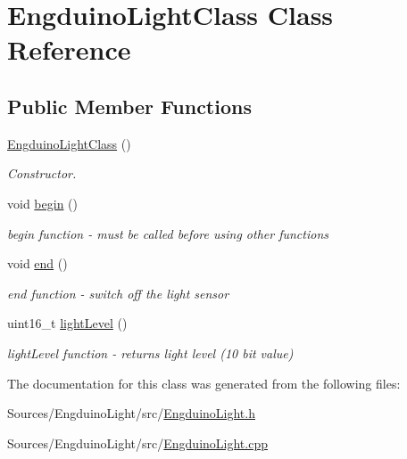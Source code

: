 \hypertarget{class_engduino_light_class}{}\section{Engduino\+Light\+Class Class Reference}
\label{class_engduino_light_class}
\subsection*{Public Member Functions}
\begin{DoxyCompactItemize}
\item 
\hyperlink{group___engduino_light_ga865276a25a2d2934c9a12f91e61d2e39}{Engduino\+Light\+Class} ()
\begin{DoxyCompactList}\small\item\em Constructor. \end{DoxyCompactList}\item 
void \hyperlink{group___engduino_light_gacbe1d008594ff191bf3e3605f02b3b45}{begin} ()
\begin{DoxyCompactList}\small\item\em begin function -\/ must be called before using other functions \end{DoxyCompactList}\item 
void \hyperlink{group___engduino_light_ga967df93f0dbc15fe2dc352f4cf4baa13}{end} ()
\begin{DoxyCompactList}\small\item\em end function -\/ switch off the light sensor \end{DoxyCompactList}\item 
uint16\+\_\+t \hyperlink{group___engduino_light_ga4ce4ac979e9b8987679edd085ea09ea9}{light\+Level} ()
\begin{DoxyCompactList}\small\item\em light\+Level function -\/ returns light level (10 bit value) \end{DoxyCompactList}\end{DoxyCompactItemize}


The documentation for this class was generated from the following files\+:\begin{DoxyCompactItemize}
\item 
Sources/\+Engduino\+Light/src/\hyperlink{_engduino_light_8h}{Engduino\+Light.\+h}\item 
Sources/\+Engduino\+Light/src/\hyperlink{_engduino_light_8cpp}{Engduino\+Light.\+cpp}\end{DoxyCompactItemize}
